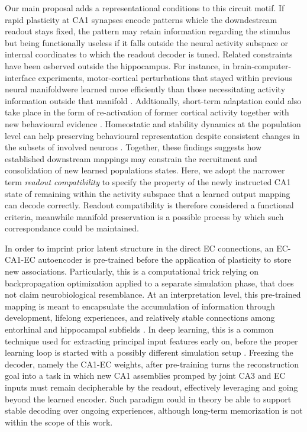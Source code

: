 Our main proposal adds a representational conditions to this circuit motif.
If rapid plasticity at CA1 synapses encode patterns whicle the downdestream readout stays fixed, the pattern may retain information regarding the stimulus but being functionally useless if it falls outside the neural activity subspace or internal coordinates to which the readout decoder is tuned.
Related constraints have been osberved outside the hippocampus.
For instance, in brain-computer-interface experiments, motor-cortical perturbations that stayed within previous neural manifoldwere learned mroe efficiently than those necessitating activity information outside that manifold \cite{sadtler2014}.
Addtionally, short-term adaptation could also take place in the form of re-activation of former cortical activity together with new behavioural evidence \cite{golub2018}.
Homeostatic and stability dynamics at the population level can help preserving behavioural representation despite consistent changes in the subsets of involved neurons \cite{gallego2020}.
Together, these findings suggests how established downstream mappings may constrain the recruitment and consolidation of new learned populations states.
Here, we adopt the narrower term \emph{readout compatibility} to specify the property of the newly instructed CA1 state of remaining within the activity subspace that a learned output mapping can decode correctly.
Readout compatibility is therefore considered a functional criteria, meanwhile manifold preservation is a possible process by which such correspondance could be maintained.

In order to imprint prior latent structure in the direct EC connections, an EC-CA1-EC autoencoder is pre-trained before the application of plasticity to store new associations. 
Particularly, this is a computational trick relying on backpropagation optimization applied to a separate simulation phase, that does not claim neurobiological resemblance.
At an interpretation level, this pre-trained mapping is meant to encapsulate the accumulation of information through development, lifelong experiences, and relatively stable connections among entorhinal and hippocampal subfields \cite{mcclelland1995, chandra2025, wen2024}. 
In deep learning, this is a common technique used for extracting principal input features early on, before the proper learning loop is started with a possibly different simulation setup \cite{yosinski2014}.
Freezing the decoder, namely the CA1-EC weights, after pre-training turns the reconstruction goal into a task in which new CA1 assemblies promped by joint CA3 and EC inputs must remain decipherable by the readout, effectively leveraging and going beyond the learned encoder.
Such paradigm could in theory be able to support stable decoding over ongoing experiences, although long-term memorization is not within the scope of this work.

